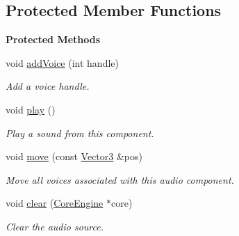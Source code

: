 \subsection*{Protected Member Functions}
\begin{Indent}\textbf{ Protected Methods}\par
\begin{DoxyCompactItemize}
\item 
\mbox{\label{classrev_1_1_audio_source_component_a10a81aadba76df906bc382bf41440596}} 
void \mbox{\hyperlink{classrev_1_1_audio_source_component_a10a81aadba76df906bc382bf41440596}{add\+Voice}} (int handle)
\begin{DoxyCompactList}\small\item\em Add a voice handle. \end{DoxyCompactList}\item 
void \mbox{\hyperlink{classrev_1_1_audio_source_component_ab2032a3b5420196c9be07659d20c304f}{play}} ()
\begin{DoxyCompactList}\small\item\em Play a sound from this component. \end{DoxyCompactList}\item 
\mbox{\label{classrev_1_1_audio_source_component_a929fa05a72e070a67a042f4ba1bfeab0}} 
void \mbox{\hyperlink{classrev_1_1_audio_source_component_a929fa05a72e070a67a042f4ba1bfeab0}{move}} (const \mbox{\hyperlink{classrev_1_1_vector}{Vector3}} \&pos)
\begin{DoxyCompactList}\small\item\em Move all voices associated with this audio component. \end{DoxyCompactList}\item 
\mbox{\label{classrev_1_1_audio_source_component_a40cdb3cb2ff088fe8c617a942619f406}} 
void \mbox{\hyperlink{classrev_1_1_audio_source_component_a40cdb3cb2ff088fe8c617a942619f406}{clear}} (\mbox{\hyperlink{classrev_1_1_core_engine}{Core\+Engine}} $\ast$core)
\begin{DoxyCompactList}\small\item\em Clear the audio source. \end{DoxyCompactList}\item 
\mbox{\label{classrev_1_1_audio_source_component_afdc0c33233ede66130f9fb70bcb12e53}} 

\end{DoxyCompactItemize}
\end{Indent}

